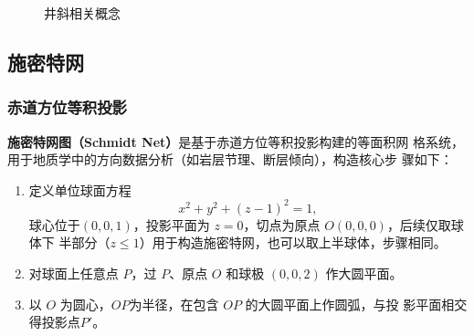 \documentclass[a4paper,twoside]{ctexart}
\begin{document}
\begin{itemize}
  \begin{figure}[htbp]
  \centering
  \hspace{1cm}
  
  \caption{井斜相关概念}
  \label{fig:井斜相关概念}
\end{figure}
\end{itemize}

\subsection{施密特网}
\label{sec:施密特网}

\subsubsection{赤道方位等积投影}

\textbf{施密特网图（Schmidt Net）}是基于赤道方位等积投影构建的等面积网
格系统，用于地质学中的方向数据分析（如岩层节理、断层倾向），构造核心步
骤如下： 
\begin{enumerate}[步骤1：]
\item  定义单位球面方程
  \begin{displaymath}
    x^2+y^2+(z-1)^2=1,
  \end{displaymath}
球心位于$(0,0,1)$，投影平面为 $z=0$，切点为原点 $O(0,0,0)$，后续仅取球体下
半部分（$z\leq 1$）用于构造施密特网，也可以取上半球体，步骤相同。 
\item 对球面上任意点 $P$，过 $P$、原点 $O$ 和球极 $(0,0,2)$ 作大圆平面。
\item 以 $O$ 为圆心，$OP$为半径，在包含 $OP$ 的大圆平面上作圆弧，与投
  影平面相交得投影点$P'$。
\end{enumerate}
\end{document}
